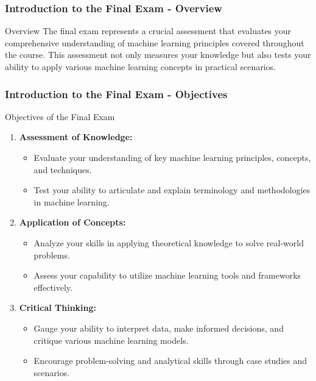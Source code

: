 \documentclass[aspectratio=169]{beamer}
\begin{document}
\frame{\titlepage}

\begin{frame}[fragile]
    \frametitle{Introduction to the Final Exam - Overview}
    \begin{block}{Overview}
        The final exam represents a crucial assessment that evaluates your comprehensive understanding 
        of machine learning principles covered throughout the course. 
        This assessment not only measures your knowledge but also tests your ability to apply various 
        machine learning concepts in practical scenarios.
    \end{block}
\end{frame}

\begin{frame}[fragile]
    \frametitle{Introduction to the Final Exam - Objectives}
    \begin{block}{Objectives of the Final Exam}
        \begin{enumerate}
            \item \textbf{Assessment of Knowledge:}
                \begin{itemize}
                    \item Evaluate your understanding of key machine learning principles, concepts, and techniques.
                    \item Test your ability to articulate and explain terminology and methodologies in machine learning.
                \end{itemize}

            \item \textbf{Application of Concepts:}
                \begin{itemize}
                    \item Analyze your skills in applying theoretical knowledge to solve real-world problems.
                    \item Assess your capability to utilize machine learning tools and frameworks effectively.
                \end{itemize}

            \item \textbf{Critical Thinking:}
                \begin{itemize}
                    \item Gauge your ability to interpret data, make informed decisions, and critique various machine learning models.
                    \item Encourage problem-solving and analytical skills through case studies and scenarios.
                \end{itemize}


\end{enumerate}
\end{block}
\end{frame}
\end{document}
